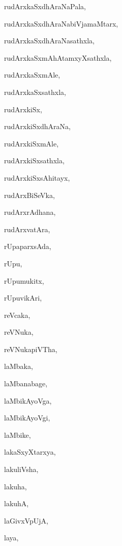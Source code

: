 \begin{multicols}{2}
{rudArxkaSxdhAraNaPala}, \pageref{rudArxkaSxdhAraNaPala}

{rudArxkaSxdhAraNabiVjamaMtarx}, \pageref{rudArxkaSxdhAraNabiVjamaMtarx}

{rudArxkaSxdhAraNasathxla}, \pageref{rudArxkaSxdhAraNasathxla}

{rudArxkaSxmAhAtamxyXsathxla}, \pageref{rudArxkaSxmAhAtamxyXsathxla}

{rudArxkaSxmAle}, \pageref{rudArxkaSxmAle}

{rudArxkaSxsathxla}, \pageref{rudArxkaSxsathxla}

{rudArxkiSx}, \pageref{rudArxkiSx}

{rudArxkiSxdhAraNa}, \pageref{rudArxkiSxdhAraNa}

{rudArxkiSxmAle}, \pageref{rudArxkiSxmAle}

{rudArxkiSxsathxla}, \pageref{rudArxkiSxsathxla}

{rudArxkiSxsAhitayx}, \pageref{rudArxkiSxsAhitayx}

{rudArxBiSeVka}, \pageref{rudArxBiSeVka}

{rudArxrAdhana}, \pageref{rudArxrAdhana}

{rudArxvatAra}, \pageref{rudArxvatAra}

{rUpaparxsAda}, \pageref{rUpaparxsAda}

{rUpu}, \pageref{rUpu}

{rUpumukitx}, \pageref{rUpumukitx}

{rUpuvikAri}, \pageref{rUpuvikAri}

{reVcaka}, \pageref{reVcaka}

{reVNuka}, \pageref{reVNuka}

{reVNukapiVTha}, \pageref{reVNukapiVTha}

{laMbaka}, \pageref{laMbaka}

{laMbanabage}, \pageref{laMbanabage}

{laMbikAyoVga}, \pageref{laMbikAyoVga}

{laMbikAyoVgi}, \pageref{laMbikAyoVgi}

{laMbike}, \pageref{laMbike}

{lakaSxyXtarxya}, \pageref{lakaSxyXtarxya}

{lakuliVsha}, \pageref{lakuliVsha}

{lakuha}, \pageref{lakuha}

{lakuhA}, \pageref{lakuhA}

{laGivxVpUjA}, \pageref{laGivxVpUjA}

{laya}, \pageref{laya}


\end{multicols}
